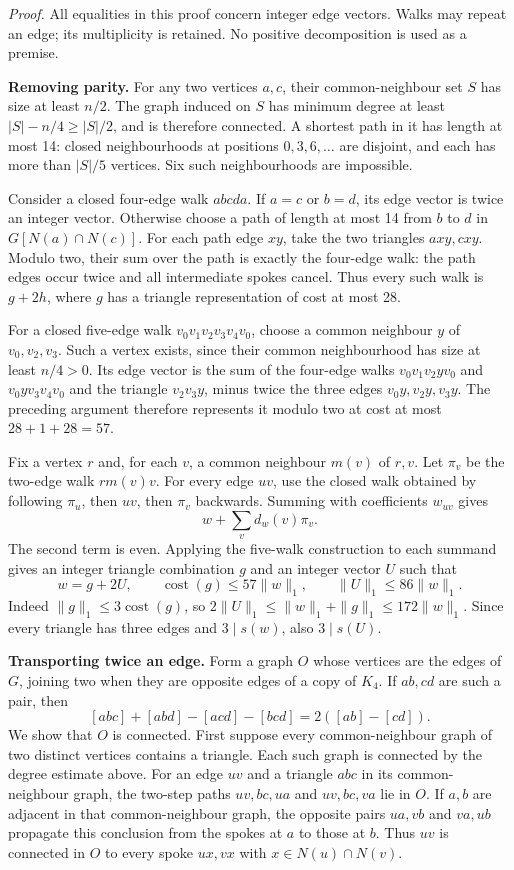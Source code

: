 \documentclass[english,11pt,a4paper]{article}
\begin{document}
\emph{Proof.} All equalities in this proof concern integer edge vectors. Walks may repeat an edge; its multiplicity is retained. No positive decomposition is used as a premise.

\textbf{Removing parity.} For any two vertices \(a,c\), their common-neighbour set \(S\) has size at least \(n/2\). The graph induced on \(S\) has minimum degree at least \(|S|-n/4\ge|S|/2\), and is therefore connected. A shortest path in it has length at most 14: closed neighbourhoods at positions \(0,3,6,\ldots\) are disjoint, and each has more than \(|S|/5\) vertices. Six such neighbourhoods are impossible.

Consider a closed four-edge walk \(abcd a\). If \(a=c\) or \(b=d\), its edge vector is twice an integer vector. Otherwise choose a path of length at most 14 from \(b\) to \(d\) in \(G[N(a)\cap N(c)]\). For each path edge \(xy\), take the two triangles \(axy,cxy\). Modulo two, their sum over the path is exactly the four-edge walk: the path edges occur twice and all intermediate spokes cancel. Thus every such walk is \(g+2h\), where \(g\) has a triangle representation of cost at most 28.

For a closed five-edge walk \(v_0v_1v_2v_3v_4v_0\), choose a common neighbour \(y\) of \(v_0,v_2,v_3\). Such a vertex exists, since their common neighbourhood has size at least \(n/4>0\). Its edge vector is the sum of the four-edge walks \(v_0v_1v_2yv_0\) and \(v_0yv_3v_4v_0\) and the triangle \(v_2v_3y\), minus twice the three edges \(v_0y,v_2y,v_3y\). The preceding argument therefore represents it modulo two at cost at most \(28+1+28=57\).

Fix a vertex \(r\) and, for each \(v\), a common neighbour \(m(v)\) of \(r,v\). Let \(\pi_v\) be the two-edge walk \(r m(v)v\). For every edge \(uv\), use the closed walk obtained by following \(\pi_u\), then \(uv\), then \(\pi_v\) backwards. Summing with coefficients \(w_{uv}\) gives \[w+\sum_v d_w(v)\pi_v.\] The second term is even. Applying the five-walk construction to each summand gives an integer triangle combination \(g\) and an integer vector \(U\) such that \[w=g+2U,\qquad \operatorname{cost}(g)\le57\|w\|_1,
\qquad \|U\|_1\le86\|w\|_1.
\tag{A.1}\] Indeed \(\|g\|_1\le3\operatorname{cost}(g)\), so \(2\|U\|_1\le\|w\|_1+\|g\|_1\le172\|w\|_1\). Since every triangle has three edges and \(3\mid s(w)\), also \(3\mid s(U)\).

\textbf{Transporting twice an edge.} Form a graph \(O\) whose vertices are the edges of \(G\), joining two when they are opposite edges of a copy of \(K_4\). If \(ab,cd\) are such a pair, then \[[abc]+[abd]-[acd]-[bcd]=2([ab]-[cd]).
\tag{A.2}\] We show that \(O\) is connected. First suppose every common-neighbour graph of two distinct vertices contains a triangle. Each such graph is connected by the degree estimate above. For an edge \(uv\) and a triangle \(abc\) in its common-neighbour graph, the two-step paths \(uv,bc,ua\) and \(uv,bc,va\) lie in \(O\). If \(a,b\) are adjacent in that common-neighbour graph, the opposite pairs \(ua,vb\) and \(va,ub\) propagate this conclusion from the spokes at \(a\) to those at \(b\). Thus \(uv\) is connected in \(O\) to every spoke \(ux,vx\) with \(x\in N(u)\cap N(v)\).
\end{document}

